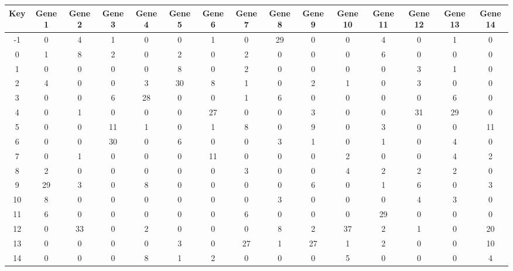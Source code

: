 \begin{tabular}{|c|c|c|c|c|c|c|c|c|c|c|c|c|c|c|}
\hline
Key & Gene 1 & Gene 2 & Gene 3 & Gene 4 & Gene 5 & Gene 6 & Gene 7 & Gene 8 & Gene 9 & Gene 10 & Gene 11 & Gene 12 & Gene 13 & Gene 14 \\
\hline
-1 & 0 & 4 & 1 & 0 & 0 & 1 & 0 & 29 & 0 & 0 & 4 & 0 & 1 & 0 \\
0 & 1 & 8 & 2 & 0 & 2 & 0 & 2 & 0 & 0 & 0 & 6 & 0 & 0 & 0 \\
1 & 0 & 0 & 0 & 0 & 8 & 0 & 2 & 0 & 0 & 0 & 0 & 3 & 1 & 0 \\
2 & 4 & 0 & 0 & 3 & 30 & 8 & 1 & 0 & 2 & 1 & 0 & 3 & 0 & 0 \\
3 & 0 & 0 & 6 & 28 & 0 & 0 & 1 & 6 & 0 & 0 & 0 & 0 & 6 & 0 \\
4 & 0 & 1 & 0 & 0 & 0 & 27 & 0 & 0 & 3 & 0 & 0 & 31 & 29 & 0 \\
5 & 0 & 0 & 11 & 1 & 0 & 1 & 8 & 0 & 9 & 0 & 3 & 0 & 0 & 11 \\
6 & 0 & 0 & 30 & 0 & 6 & 0 & 0 & 3 & 1 & 0 & 1 & 0 & 4 & 0 \\
7 & 0 & 1 & 0 & 0 & 0 & 11 & 0 & 0 & 0 & 2 & 0 & 0 & 4 & 2 \\
8 & 2 & 0 & 0 & 0 & 0 & 0 & 3 & 0 & 0 & 4 & 2 & 2 & 2 & 0 \\
9 & 29 & 3 & 0 & 8 & 0 & 0 & 0 & 0 & 6 & 0 & 1 & 6 & 0 & 3 \\
10 & 8 & 0 & 0 & 0 & 0 & 0 & 0 & 3 & 0 & 0 & 0 & 4 & 3 & 0 \\
11 & 6 & 0 & 0 & 0 & 0 & 0 & 6 & 0 & 0 & 0 & 29 & 0 & 0 & 0 \\
12 & 0 & 33 & 0 & 2 & 0 & 0 & 0 & 8 & 2 & 37 & 2 & 1 & 0 & 20 \\
13 & 0 & 0 & 0 & 0 & 3 & 0 & 27 & 1 & 27 & 1 & 2 & 0 & 0 & 10 \\
14 & 0 & 0 & 0 & 8 & 1 & 2 & 0 & 0 & 0 & 5 & 0 & 0 & 0 & 4 \\
\hline
\end{tabular}